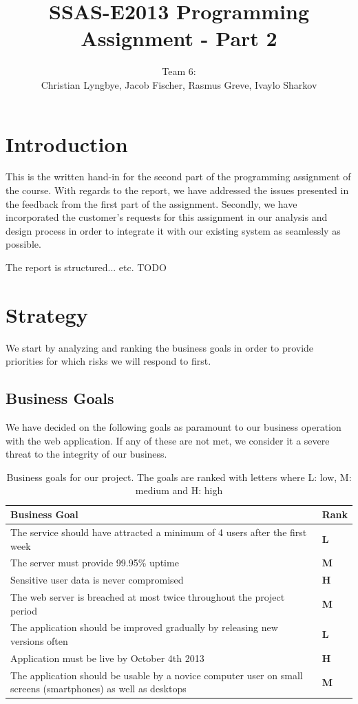\documentclass[a4paper]{article}
\title{SSAS-E2013 Programming Assignment - Part 2}
\author{Team 6:\\Christian Lyngbye, Jacob Fischer, Rasmus Greve, Ivaylo Sharkov}
\begin{document}
\maketitle

\section{Introduction}
This is the written hand-in for the second part of the programming assignment of the course. With regards to the report, we have addressed the issues presented in the feedback from the first part of the assignment. Secondly, we have incorporated the customer's requests for this assignment in our analysis and design process in order to integrate it with our existing system as seamlessly as possible.

The report is structured... etc. TODO

\section{Strategy}

We start by analyzing and ranking the business goals in order to provide priorities for which risks we will respond to first.
\subsection{Business Goals}
We have decided on the following goals as paramount to our business operation with the web application. If any of these are not met, we consider it a severe threat to the integrity of our business.

\begin{table}[h!]
	\begin{tabular}{|p{10cm}|l|}
		\hline
		\textbf{Business Goal} & \textbf{Rank} \\ \hline
The service should have attracted a minimum of 4 users after the first week & \textbf{L} \\ \hline
The server must provide 99.95\% uptime   & \textbf{M} \\ \hline
Sensitive user data is never compromised & \textbf{H} \\ \hline
The web server is breached at most twice throughout the project period &  \textbf{M} \\ \hline
The application should be improved gradually by releasing new versions often & \textbf{L} \\ \hline
Application must be live by October 4th 2013 &	\textbf{H}\\ \hline
The application should be usable by a novice computer user on small screens (smartphones) as well as desktops & \textbf{M}\\ \hline
	\end{tabular}
	\caption{Business goals for our project. The goals are ranked with letters where L: low, M: medium and H: high}
	\label{tab:business_goals}
\end{table}
\end{document}
